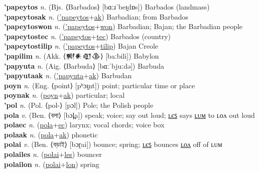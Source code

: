 \textbf{'papeytos} \textit{n.} (Bjs. ⟨Barbados⟩ [bɑːɹˈbeɪ̯dɒs])
Barbados (landmass) \label{'papeytos} \\
\textbf{'papeytosak} \textit{n.} (\hyperref['papeytos]{'papeytos}+\hyperref[ak]{ak})
Barbadian; from Barbados \label{'papeytosak} \\
\textbf{'papeytoswon} \textit{n.} (\hyperref['papeytos]{'papeytos}+\hyperref[won]{won})
Barbadian; Bajan; the Barbadian people \label{'papeytoswon} \\
\textbf{'papeytostec} \textit{n.} (\hyperref['papeytos]{'papeytos}+\hyperref[tec]{tec})
Barbados (country) \label{'papeytostec} \\
\textbf{'papeytostilip} \textit{n.} (\hyperref['papeytos]{'papeytos}+\hyperref[tilip]{tilip})
Bajan Creole \label{'papeytostilip} \\
\textbf{'papilim} \textit{n.} (Akk. ⟨𒆍𒀭𒊏𒆠⟩ [baːbili])
Babylon \label{'papilim} \\
\textbf{'papyuta} \textit{n.} (Aig. ⟨Barbuda⟩ [bɑːˈbjuːdə])
Barbuda \label{'papyuta} \\
\textbf{'papyutaak} \textit{n.} (\hyperref['papyuta]{'papyuta}+\hyperref[ak]{ak})
Barbudan \label{'papyutaak} \\
\textbf{poyn} \textit{n.} (Eng. ⟨point⟩ [pʰɔɪ̯nt])
point; particular time or place \label{poyn} \\
\textbf{poynak} \textit{n.} (\hyperref[poyn]{poyn}+\hyperref[ak]{ak})
particular; local \label{poynak} \\
\textbf{'pol} \textit{n.} (Pol. ⟨pol-⟩ [pɔl])
Pole; the Polish people \label{'pol} \\
\textbf{pola} \textit{v.} (Ben. ⟨বলা⟩ [bɔl̪a])
speak; voice; say out loud; \hyperref[polales]{ʟєꜱ} says \hyperref[polalum]{ʟᴜᴍ} to ʟᴏᴧ out loud \label{pola} \\
\textbf{polaec} \textit{n.} (\hyperref[pola]{pola}+\hyperref[ec]{ec})
larynx; vocal chords; voice box \label{polaec} \\
\textbf{polaak} \textit{n.} (\hyperref[pola]{pola}+\hyperref[ak]{ak})
phonetic \label{polaak} \\
\textbf{polai} \textit{v.} (Ben. ⟨বড়াই⟩ [bɔɽai])
bounce; spring; \hyperref[polailes]{ʟєꜱ} bounces \hyperref[polailon]{ʟᴏᴧ} off of ʟᴜᴍ \label{polai} \\
\textbf{polailes} \textit{n.} (\hyperref[polai]{polai}+\hyperref[les]{les})
bouncer \label{polailes} \\
\textbf{polailon} \textit{n.} (\hyperref[polai]{polai}+\hyperref[lon]{lon})
spring \label{polailon} \\
